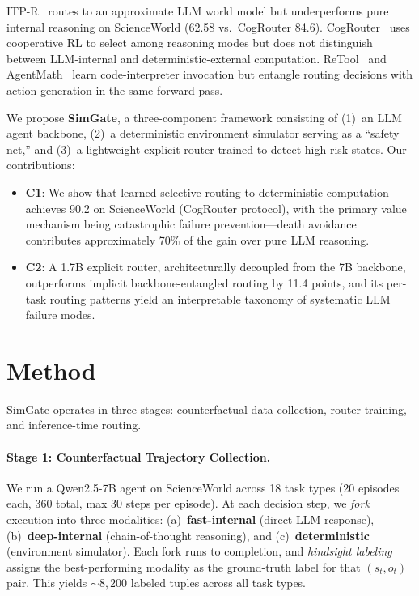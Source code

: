 \documentclass[11pt,a4paper]{article}
\begin{document}
ITP-R~\cite{qiu2024itpr} routes to an approximate LLM world model but underperforms pure internal reasoning on ScienceWorld (62.58 vs.\ CogRouter 84.6).
CogRouter~\cite{qian2024cogrouter} uses cooperative RL to select among reasoning modes but does not distinguish between LLM-internal and deterministic-external computation.
ReTool~\cite{feng2025retool} and AgentMath~\cite{zhang2024agentmath} learn code-interpreter invocation but entangle routing decisions with action generation in the same forward pass.

We propose \textbf{SimGate}, a three-component framework consisting of (1)~an LLM agent backbone, (2)~a deterministic environment simulator serving as a ``safety net,'' and (3)~a lightweight explicit router trained to detect high-risk states.
Our contributions:

\begin{itemize}[nosep,leftmargin=*]
\item \textbf{C1}: We show that learned selective routing to deterministic computation achieves 90.2 on ScienceWorld (CogRouter protocol), with the primary value mechanism being catastrophic failure prevention---death avoidance contributes approximately 70\% of the gain over pure LLM reasoning.
\item \textbf{C2}: A 1.7B explicit router, architecturally decoupled from the 7B backbone, outperforms implicit backbone-entangled routing by 11.4 points, and its per-task routing patterns yield an interpretable taxonomy of systematic LLM failure modes.
\end{itemize}

\section{Method}

SimGate operates in three stages: counterfactual data collection, router training, and inference-time routing.

\paragraph{Stage 1: Counterfactual Trajectory Collection.}
We run a Qwen2.5-7B agent on ScienceWorld across 18 task types (20 episodes each, 360 total, max 30 steps per episode).
At each decision step, we \emph{fork} execution into three modalities: (a)~\textbf{fast-internal} (direct LLM response), (b)~\textbf{deep-internal} (chain-of-thought reasoning), and (c)~\textbf{deterministic} (environment simulator).
Each fork runs to completion, and \emph{hindsight labeling} assigns the best-performing modality as the ground-truth label for that $(s_t, o_t)$ pair.
This yields ${\sim}8{,}200$ labeled tuples across all task types.
\end{document}
